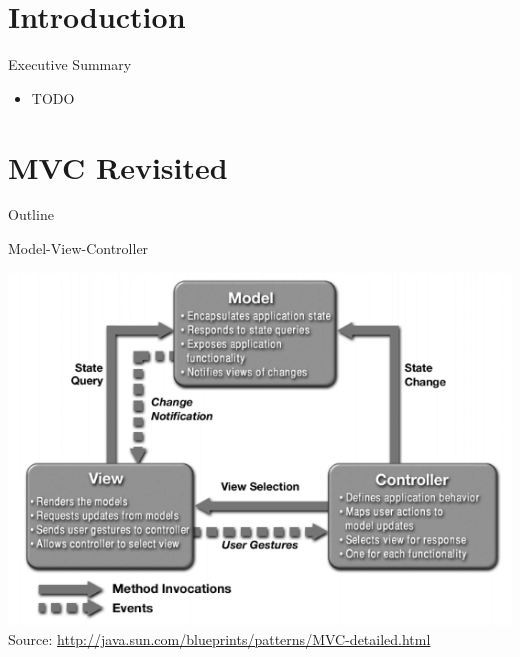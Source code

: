 \section*{Introduction}

\begin{frame}{Executive Summary}
  \begin{itemize}
  \item TODO
  \end{itemize}
\end{frame}


\section{MVC Revisited}

\begin{frame}{Outline}
  \tableofcontents[current]
\end{frame}

\begin{frame}{Model-View-Controller}
  \begin{center}
    \includegraphics[scale=0.4]{figures/mvc} \\
    \tiny{Source: \url{http://java.sun.com/blueprints/patterns/MVC-detailed.html}}
  \end{center}
\end{frame}

